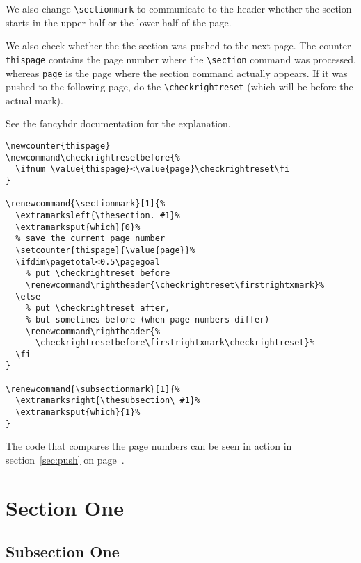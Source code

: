 \documentclass{article}
\newcounter{thispage}
\newcommand{\which}{}
\renewcommand\which{-1}%
\renewcommand{\sectionmark}[1]{%
  \InsertMark{section}{\thesection. #1}%
  \InsertMark{which}{\which}%
}%
\renewcommand{\subsectionmark}[1]{%
  \InsertMark{subsection}{\thesubsection. #1}%
  \InsertMark{which}{1}%
}
\begin{document}
\noindent
\begin{boxedminipage}{\textwidth}
We also change \verb|\sectionmark| to communicate to the header whether the section starts in the upper half or the lower half of the page.

We also check whether the the section was pushed to the next page.
The counter \texttt{thispage} contains the page number where the \verb|\section|
command was processed, whereas \texttt{page} is the page where the section
command actually appears. If it was pushed to the following page, do
the \verb|\checkrightreset| (which will be before the actual mark).

See the \textsf{fancyhdr} documentation for the explanation.

\begin{verbatim}
\newcounter{thispage}
\newcommand\checkrightresetbefore{% 
  \ifnum \value{thispage}<\value{page}\checkrightreset\fi
}

\renewcommand{\sectionmark}[1]{%
  \extramarksleft{\thesection. #1}%
  \extramarksput{which}{0}%
  % save the current page number
  \setcounter{thispage}{\value{page}}%
  \ifdim\pagetotal<0.5\pagegoal
    % put \checkrightreset before
    \renewcommand\rightheader{\checkrightreset\firstrightxmark}%
  \else
    % put \checkrightreset after,
    % but sometimes before (when page numbers differ)
    \renewcommand\rightheader{%
      \checkrightresetbefore\firstrightxmark\checkrightreset}%
  \fi
}

\renewcommand{\subsectionmark}[1]{%
  \extramarksright{\thesubsection\ #1}%
  \extramarksput{which}{1}%
}
\end{verbatim}

The code that compares the page numbers can be seen in action in section~\ref{sec:push} on page~\pageref{sec:push}.

\end{boxedminipage}

\newpage
\pagestyle{fancy}

\section{Section One}

\subsection{Subsection One}
\end{document}
